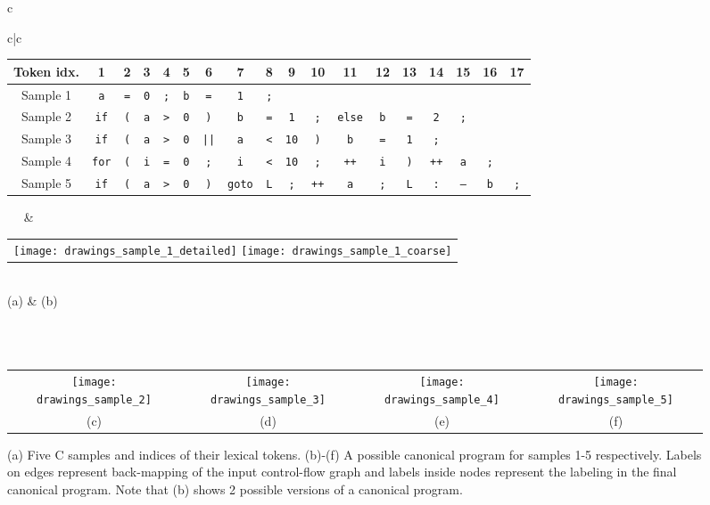 \documentclass[envcountsame]{llncs}
\begin{document}
\begin{figure}[!htb]
\begin{tabular}{c}
\begin{tabular}{c|c}
\begin{tabular}{c|| c|c|c|c|c| c|c|c|c|c| c|c|c|c|c| c|c}
Token idx. &
1 & 2 & 3 & 4 & 5 &
6 & 7 & 8 & 9 & 10 &
11 & 12 & 13 & 14 & 15 &
16 & 17
\\ \hline\hline
Sample 1 & 
\texttt{a} & \texttt{=} & \texttt{0} & \texttt{;} & \texttt{b} &
\texttt{=} & \texttt{1} & \texttt{;} & & & & & & & & &
\\ \hline
Sample 2 & 
\texttt{if} & \texttt{(} & \texttt{a} & \texttt{>} & \texttt{0} &
\texttt{)} & \texttt{b} & \texttt{=} & \texttt{1} & \texttt{;} &
\texttt{else} & \texttt{b} & \texttt{=} & \texttt{2} & \texttt{;} & &
\\ \hline
Sample 3 & 
\texttt{if} & \texttt{(} & \texttt{a} & \texttt{>} & \texttt{0} &
\texttt{||} & \texttt{a} & \texttt{<} & \texttt{10} & \texttt{)} &
\texttt{b} & \texttt{=} & \texttt{1} & \texttt{;} & & &
\\ \hline
Sample 4 & 
\texttt{for} & \texttt{(} & \texttt{i} & \texttt{=} & \texttt{0} &
\texttt{;} & \texttt{i} & \texttt{<} & \texttt{10} & \texttt{;} &
\texttt{++} & \texttt{i} & \texttt{)} & \texttt{++} & \texttt{a} &
\texttt{;} &
\\ \hline
Sample 5 & 
\texttt{if} & \texttt{(} & \texttt{a} & \texttt{>} & \texttt{0} &
\texttt{)} & \texttt{goto} & \texttt{L} & \texttt{;} & \texttt{++} &
\texttt{a} & \texttt{;} & \texttt{L} & \texttt{:} & \texttt{--} &
\texttt{b} & \texttt{;}
\\
\end{tabular}
~~ & ~~
\begin{tabular}{c}
\texttt{[image: drawings\_sample\_1\_detailed]}
\texttt{[image: drawings\_sample\_1\_coarse]}
\end{tabular}
\\
(a) & (b)
\end{tabular}
\\ \\
\begin{tabular}{c|c|c|c}
\texttt{[image: drawings\_sample\_2]} &
\texttt{[image: drawings\_sample\_3]} &
\texttt{[image: drawings\_sample\_4]} &
\texttt{[image: drawings\_sample\_5]}
\\
(c) & (d) & (e) & (f)
\end{tabular}
\end{tabular}
\caption{(a) Five C samples and indices of their lexical tokens. (b)-(f) A
possible canonical program for samples 1-5 respectively. Labels on edges
represent back-mapping of the input control-flow graph and labels inside nodes
represent the labeling in the final canonical program. Note that (b) shows 2
possible versions of a canonical program.}
\label{fig:TowardsCanonicalProgram}
\end{figure}
\end{document}
